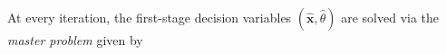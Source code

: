 \documentclass{article}
\newcommand{\st}{\textnormal{s.t.}}
\newcommand{\RR}{\mathbb{R}}
\newcommand{\X}{\mathcal{X}}
\newcommand{\tr}{\textup{tr}}
\begin{document}
At every iteration, the first-stage decision variables $(\hat{\bm x}, \hat{\theta})$ are solved via the \textit{master problem} given by %
\end{document}
